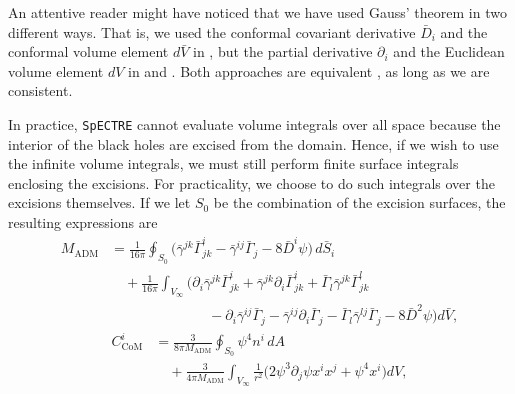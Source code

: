 \documentclass{../document}
\begin{document}
      An attentive reader might have noticed that we have used Gauss' theorem in two different ways. That is, we used the conformal covariant derivative $\bar D_i$ and the conformal volume element $d\bar{V}$ in \eq{\eqref{eq:Madm-Gauss}}, but the partial derivative $\partial_i$ and the Euclidean volume element $dV$ in \eq{\eqref{eq:CoM-Gauss}} and \eq{\eqref{eq:Padm-Gauss}}. Both approaches are equivalent \cite{DeBenedictis_1998, Teukolsky_2016}, as long as we are consistent.
      
      In practice, {\tt SpECTRE} cannot evaluate volume integrals over all space because the interior of the black holes are excised from the domain. Hence, if we wish to use the infinite volume integrals, we must still perform finite surface integrals enclosing the excisions. For practicality, we choose to do such integrals over the excisions themselves. If we let $S_0$ be the combination of the excision surfaces, the resulting expressions are
      \begin{equation} \label{eq:Madm-mixed}
        \begin{aligned}
        M_\text{ADM}
        &= \frac{1}{16\pi} \oint_{S_0}  \Big(
            \bar\gamma^{jk} \bar\Gamma^i_{jk}
            - \bar\gamma^{ij} \bar\Gamma_{j}
            - 8 \bar D^i \psi
            \Big) \, d\bar{S}_i
            \\ &\quad
            + \frac{1}{16\pi}
            \int_{V_\infty} \Big(
              \partial_i \bar\gamma^{jk} \bar\Gamma^i_{jk}
              + \bar\gamma^{jk} \partial_i \bar\Gamma^i_{jk}
              + \bar\Gamma_l \bar\gamma^{jk} \bar\Gamma^l_{jk}
              \\ &\qquad\qquad\qquad\quad
              - \partial_i \bar\gamma^{ij} \bar\Gamma_j
              - \bar\gamma^{ij} \partial_i \bar\Gamma_j
              - \bar\Gamma_l \bar\gamma^{lj} \bar\Gamma_j
              - 8 \bar D^2 \psi
            \Big) d\bar{V},
        \end{aligned}
      \end{equation}
      \begin{equation} \label{eq:CoM-mixed}
        \begin{aligned}
          C_\text{CoM}^i
          &= \frac{3}{8 \pi M_\text{ADM}}
              \oint_{S_0} \psi^4 n^i \, dA
              \\ &\quad
            +\frac{3}{4 \pi M_\text{ADM}}
              \int_{V_\infty} \frac{1}{r^2} \Big(
                2 \psi^3 \partial_j \psi x^i x^j
                + \psi^4 x^i
              \Big) dV,
        \end{aligned}
      \end{equation}
\end{document}
